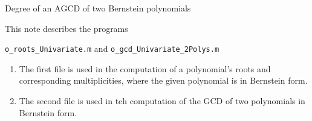 \documentclass[a4paper,11pt]{article}
\newcommand{\AGCD}{\textrm{AGCD}}
\begin{document}
%
\begin{center}
Degree of an $\AGCD$ of two Bernstein polynomials
\end{center}
%
\date{}
%

\hrulefill


\vspace{0.5cm}

This note describes the programs
%
\begin{center}
\texttt{o\_roots\_Univariate.m} 
and 
\texttt{o\_gcd\_Univariate\_2Polys.m}
\end{center}
%
\begin{enumerate}

	\item The first file is used in the computation of a polynomial's roots and corresponding multiplicities, where the given polynomial is in Bernstein form.
	
	\item The second file is used in teh computation of the \gls{GCD} of two polynomials in Bernstein form.


\end{enumerate}
\end{document}
